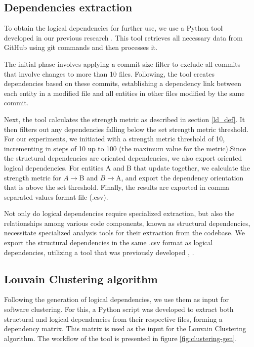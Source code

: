 \documentclass[conference]{IEEEtran}
\begin{document}
\subsection{Dependencies extraction}

To obtain the logical dependencies for further use, we use a Python tool developed in our previous research \cite{articlekeyclass23}. This tool retrieves all necessary data from GitHub \cite{ApacheAntGitHub} using git commands and then processes it. 

The initial phase involves applying a commit size filter to exclude all commits that involve changes to more than 10 files. Following, the tool creates dependencies based on these commits, establishing a dependency link between each entity in a modified file and all entities in other files modified by the same commit. 

Next, the tool calculates the strength metric as described in section \ref{ld_def}. It then filters out any dependencies falling below the set strength metric threshold. For our experiments, we initiated with a strength metric threshold of 10, incrementing in steps of 10 up to 100 (the maximum value for the metric).Since the structural dependencies are oriented dependencies, we also export oriented logical dependencies. For entities A and B that update together, we calculate the strength metric for $A \rightarrow $B and $B \rightarrow $A, and export the dependency orientation that is above the set threshold. Finally, the results are exported in comma separated values format file (.csv). 

Not only do logical dependencies require specialized extraction, but also the relationships among various code components, known as structural dependencies, necessitate specialized analysis tools for their extraction from the codebase. We export the structural dependencies in the same .csv format as logical dependencies, utilizing a tool that was previously developed \cite{articlekeyclass23}, \cite{Finding-key-classes}.


\subsection{Louvain Clustering algorithm}

Following the generation of logical dependencies, we use them as input for software clustering. For this, a Python script was developed to extract both structural and logical dependencies from their respective files, forming a dependency matrix. This matrix is used as the input for the Louvain Clustering algorithm. The workflow of the tool is presented in figure \ref{fig:clustering-gen}.
\end{document}
